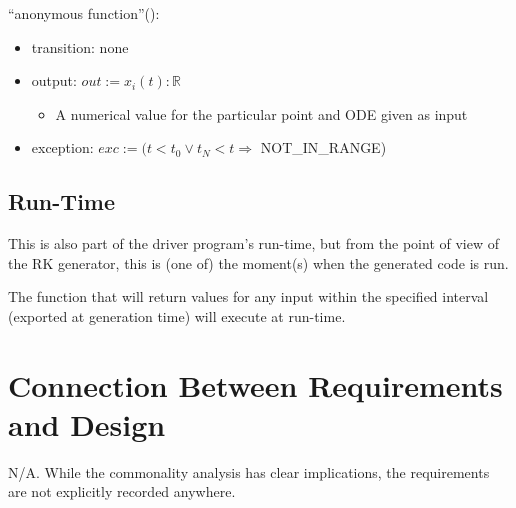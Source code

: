 \documentclass[12pt, titlepage]{article}
\begin{document}
\noindent ``anonymous function''():
\begin{itemize}
  \item transition: none
  \item output: $out := x_{i}(t) : \mathbb{R}$
  \begin{itemize}
    \item A numerical value for the particular point and ODE given as input
  \end{itemize}
  \item exception: $exc := (t < t_0 \lor t_N < t \Rightarrow$ NOT\_IN\_RANGE)
\end{itemize}
\subsection{Run-Time}\label{ssec:run-time}
This is also part of the driver program's run-time, but from the point of view 
of the RK generator, this is (one of) the moment(s) when the generated code is 
run.

The function that will return values for any input within the specified 
interval (exported at generation time) will execute at run-time.




\section{Connection Between Requirements and Design} \label{SecConnection}

N/A. While the commonality analysis has clear implications, the requirements 
are not explicitly recorded anywhere. 
\end{document}
